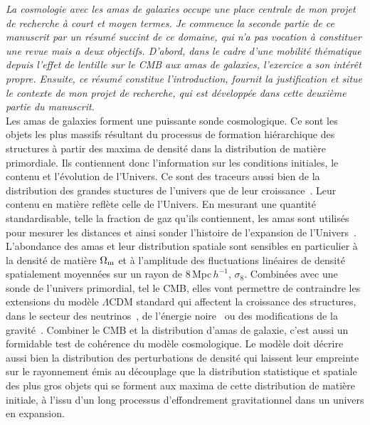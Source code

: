 
%
%
%
%
%                 
%
%
%

\emph{La cosmologie avec les amas de galaxies occupe une place centrale de
mon projet de recherche à court et moyen termes. Je commence la
seconde partie de ce manuscrit par un résumé succint de ce domaine,
qui n'a pas vocation à constituer une revue mais a deux
objectifs. D'abord, dans le cadre d'une mobilité thématique depuis
l'effet de lentille sur le CMB aux amas de galaxies, l'exercice a son
intérêt propre. Ensuite, ce résumé constitue l'introduction, fournit
la justification et situe le contexte de mon projet de recherche, qui
est développée dans cette deuxième partie du manuscrit.}\\


Les amas de galaxies forment une puissante sonde cosmologique.
Ce sont les objets les plus massifs résultant du processus de formation
hiérarchique des structures à partir des maxima de
densité dans la distribution de matière primordiale. Ils contiennent
donc l'information sur les conditions initiales, le contenu et
l'évolution de l'Univers. Ce sont des traceurs aussi bien de la
distribution des grandes stuctures de l'univers que de leur
croissance~\citep[pour une revue]{Allen2011}. Leur contenu en matière
reflète celle de l'Univers. En mesurant une quantité
standardisable, telle la fraction de gaz qu'ils contiennent, les amas
sont utilisés pour mesurer les distances et ainsi sonder
l'histoire de l'expansion de l'Univers~\citep{Sasaki1996, Allen2008,
Ettori2009}.
L'abondance des amas et leur distribution spatiale sont sensibles en
particulier à la densité de matière $\Omega_{\rm{m}}$ et à l'amplitude
des fluctuations linéaires de densité spatialement moyennées sur un
rayon de 8\,Mpc\,$h^{-1}$, $\sigma_8$. Combinées
avec une sonde de l'univers primordial, tel le CMB, elles vont
permettre de contraindre les extensions du modèle
$\Lambda$CDM standard qui affectent la croissance des structures, dans
le secteur des neutrinos~\citep{Wang2005, Bolliet2019}, de l'énergie
noire~\citep{Haiman2001} ou des modifications de la
gravité~\citep{Mohr2003, Hagstotz2019}. Combiner le CMB et
la distribution d'amas de galaxie,
c'est aussi un formidable test de cohérence du modèle cosmologique.
Le modèle doit décrire aussi bien la distribution des perturbations de
densité qui laissent leur empreinte sur le rayonnement émis au
découplage que la distribution statistique et spatiale des plus gros
objets qui se forment aux maxima de cette distribution de matière
initiale, à l'issu d'un long processus d'effondrement gravitationnel
dans un univers en expansion. 

